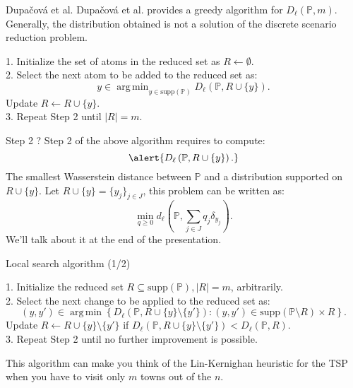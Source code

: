 \documentclass{beamer}
\DeclareMathOperator*{\argmin}{arg\,min}
\theoremstyle{plain}
\begin{document}
\begin{frame}{Dupačová et al.}
Dupačová et al. \cite{dupacova_scenario_2003} provides a greedy algorithm for $D_\ell\left(\mathbb{P},m\right)$. Generally, the distribution obtained is \alert{not a solution} of the discrete scenario reduction problem.
\begin{algorithm}[H]
  \caption{Dupačová et al.}\label{dupacova}
  1. Initialize the set of atoms in the reduced set as $R\gets \emptyset.$ \\ 2. Select the next atom to be added to the reduced set as: $$ y\in\argmin_{y\in \text{supp}\left(\mathbb{P}\right)}D_\ell\left(\mathbb{P},R\cup\{y\}\right).
  $$
  Update $R\gets R\cup \{y\}$.\\ 3. Repeat Step 2 until $\lvert R\rvert=m$.
\end{algorithm}
\end{frame}

\begin{frame}{Step 2 ?}
    Step 2 of the above algorithm requires to compute:
    $$
    \alert{D_\ell\left(\mathbb{P},R\cup\{y\}\right).}
    $$
    The smallest Wasserstein distance between $\mathbb{P}$ and a distribution supported on $R\cup\{y\}$. Let $R\cup\{y\}=\{y_j\}_{j\in J}$, this problem can be written as: 
    $$
    \min_{q\geq 0}d_\ell\left(\mathbb{P}, \sum_{j\in J}q_j\delta_{y_j}\right).
    $$
    We'll talk about it at the end of the presentation.
\end{frame}

\begin{frame}{Local search algorithm (1/2)}
    \begin{algorithm}[H]
    \caption{Local search algorithm for $D_\ell\left(\mathbb{P},m\right)$}\label{Local search}
    1. Initialize the reduced set $R\subseteq \text{supp}\left(\mathbb{P}\right), \lvert R\rvert = m$, arbitrarily. \\ 2. Select the next change to be applied to the reduced set as:
    $$
    \left(y,y'\right)\in\argmin\left\{D_\ell\left(\mathbb{P},R\cup\{y\}\setminus \{y'\}\right) : \left(y,y'\right)\in\text{supp}\left(\mathbb{P}\setminus R\right)\times R\right\}.
    $$
    Update $R\gets R\cup \{y\}\setminus \{y'\}$ if $D_\ell\left(\mathbb{P}, R\cup\{y\}\setminus \{y'\} \right)<D_\ell\left(\mathbb{P},R\right).$ \\ 3. Repeat Step 2 until no further improvement is possible.
    \end{algorithm}
    This algorithm can make you think of the Lin-Kernighan heuristic for the TSP when you have to visit only $m$ towns out of the $n$.
\end{frame}
\end{document}
